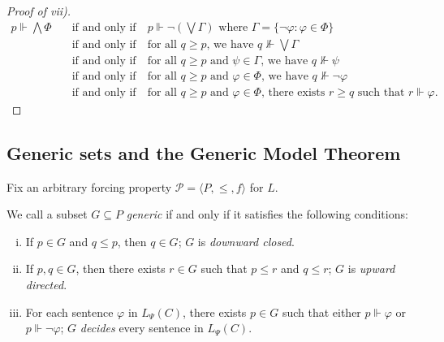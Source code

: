 \documentclass{scrartcl}
\renewcommand{\phi}{\varphi}
\newcommand{\SP}{\mathscr{P}}
\begin{document}
\begin{proof}[Proof of vii)]

\begin{align*}
p\Vdash \bigwedge \Phi   \quad &\text{if and only if} \quad  p\Vdash \neg (\bigvee \Gamma) \text{ where } \Gamma = \{ \neg\phi \colon \phi\in \Phi \} \\
&\text{if and only if} \quad \text{for all } q\ge p \text{, we have } q \not \Vdash \bigvee \Gamma \\
&\text{if and only if} \quad \text{for all } q\ge p \text{ and } \psi\in \Gamma \text{, we have } q\not \Vdash \psi \\
&\text{if and only if} \quad \text{for all } q\ge p \text{ and } \phi\in \Phi \text{, we have } q\not \Vdash \neg\phi \\
&\text{if and only if} \quad \text{for all } q\ge p \text{ and } \phi\in \Phi \text{, there exists } r\ge q \text{ such that } r\Vdash \phi.
\end{align*}

\end{proof}






\subsection{Generic sets and the Generic Model Theorem}

Fix an arbitrary forcing property $\SP = \langle P, \le, f \rangle$ for $L$.


\begin{definition}
\label{D:generic}
We call a subset $G\subseteq P$ \emph{generic} if and only if it satisfies the following conditions:

\begin{enumerate}[i)]

\item
If $p\in G$ and $q\le p$, then $q\in G$; $G$ is \emph{downward closed}.

\item
If $p,q\in G$, then there exists $r\in G$ such that $p\le r$ and $q\le r$; $G$ is  \emph{upward directed}.

\item
For each sentence $\phi$ in $L_\Psi(C)$, there exists $p\in G$ such that either $p\Vdash\phi$ or $p\Vdash\neg\phi$; $G$ \emph{decides} every sentence in $L_\Psi(C)$. 

\end{enumerate}
\end{definition}
\end{document}
